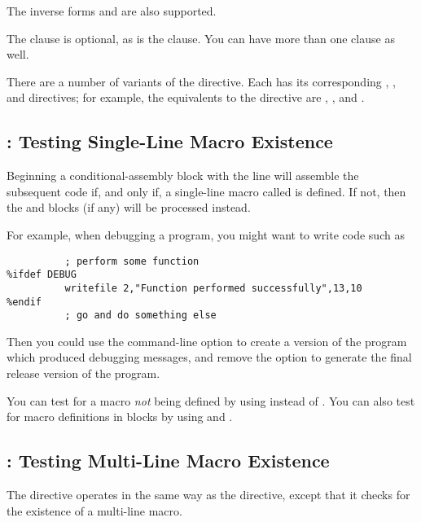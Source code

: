 The inverse forms  and  are also supported.

The  clause is optional, as is the  clause.
You can have more than one  clause as well.

There are a number of variants of the  directive.  Each has its
corresponding , , and  directives; for
example, the equivalents to the  directive are ,
, and .

\subsection{: Testing Single-Line Macro Existence
}
\label{susbec:ifdef}

Beginning a conditional-assembly block with the line 
will assemble the subsequent code if, and only if, a single-line macro called
 is defined. If not, then the  and 
blocks (if any) will be processed instead.

For example, when debugging a program, you might want to write code
such as

\begin{lstlisting}
          ; perform some function
%ifdef DEBUG
          writefile 2,"Function performed successfully",13,10
%endif
          ; go and do something else
\end{lstlisting}

Then you could use the command-line option  to create a
version of the program which produced debugging messages, and remove
the option to generate the final release version of the program.

You can test for a macro \emph{not} being defined by using
 instead of . You can also test
for macro definitions in  blocks by using
 and .

\subsection{: Testing Multi-Line Macro Existence
}
\label{subsec:ifmacro}

The  directive operates in the same way as the 
directive, except that it checks for the existence of a multi-line macro.

